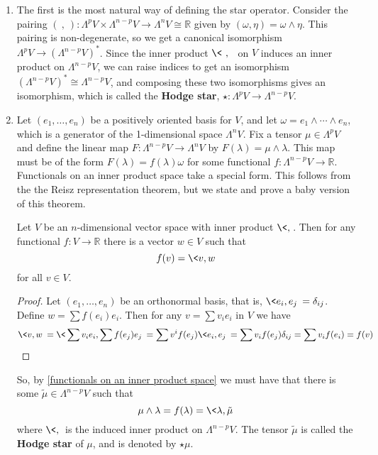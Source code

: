 \begin{enumerate}

	\item The first is the most natural way of defining the star operator. Consider the pairing $(\ ,\ ) : \Lambda^p V \times \Lambda^{n-p} V \rightarrow \Lambda^n V \cong \mathbb R$ given by $(\omega,\eta) = \omega \wedge \eta$. This pairing is non-degenerate, so we get a canonical isomorphism $\Lambda^p V \rightarrow \left( \Lambda^{n-p} V \right)^*$. Since the inner product $\<\ ,\ \>$ on $V$ induces an inner product on $\Lambda^{n-p} V$, we can raise indices to get an isomorphism $\left( \Lambda^{n-p} V \right)^* \cong \Lambda^{n-p} V$, and composing these two isomorphisms gives an isomorphism, which is called the \textbf{Hodge star}, $\star : \Lambda^p V \rightarrow \Lambda^{n-p} V$.

	\item Let $(e_1,\ldots,e_n)$ be a positively oriented basis for $V$, and let $\omega = e_1 \wedge \cdots \wedge e_n$, which is a generator of the 1-dimensional space $\Lambda^n V$. Fix a tensor $\mu \in \Lambda^p V$ and define the linear map $F : \Lambda^{n-p} V \rightarrow \Lambda^n V$ by $F(\lambda) = \mu \wedge \lambda$. This map must be of the form $F(\lambda) = f(\lambda) \omega$ for some functional $f : \Lambda^{n-p} V \rightarrow \mathbb R$. Functionals on an inner product space take a special form. This follows from the the Reisz representation theorem, but we state and prove a baby version of this theorem.

\begin{prop}
\label{functionals on an inner product space}
Let $V$ be an $n$-dimensional vector space with inner product $\< , \>$. Then for any functional $f : V \rightarrow \mathbb R$ there is a vector $w \in V$ such that
\[ f(v) = \< v,w \> \]
for all $v \in V$.
\end{prop}
\begin{proof}
Let $(e_1,\ldots,e_n)$ be an orthonormal basis, that is, $\< e_i,e_j \> = \delta_{ij}$. Define $w = \sum f(e_i) e_i$. Then for any $v = \sum v_i e_i$ in $V$ we have
\[ \< v,w \> = \< \sum v_i e_i, \sum f(e_j) e_j \> = \sum v^i f(e_j) \< e_i,e_j \> = \sum v_i f(e_j) \delta_{ij} = \sum v_i f(e_i) = f(v) \]
\end{proof}

So, by \cref{functionals on an inner product space} we must have that there is some $\tilde{\mu} \in \Lambda^{n-p} V$ such that
\[ \mu \wedge \lambda = f(\lambda) = \< \lambda, \tilde{\mu} \> \]
where $\< , \>$ is the induced inner product on $\Lambda^{n-p} V$. The tensor $\tilde{\mu}$ is called the \textbf{Hodge star} of $\mu$, and is denoted by $\star \mu$. 


\end{enumerate}
